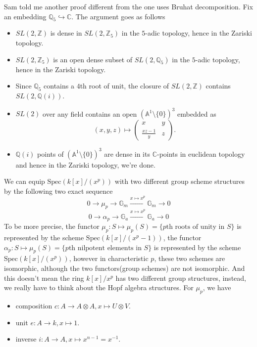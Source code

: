 \documentclass[../main.tex]{subfiles}
\begin{document}
\begin{example}
Sam told me another proof different from the one uses Bruhat decomposition. Fix an embedding $\mathbb{Q}_{5}\hookrightarrow \mathbb{C}$. The argument goes as follows
\begin{itemize}
\item $SL(2,\mathbb{Z})$ is dense in $SL(2,\mathbb{Z}_{5})$ in the $5$-adic topology, hence in the Zariski topology.
\item $SL(2,\mathbb{Z}_{5})$ is an open dense subset of $SL(2,\mathbb{Q}_{5})$ in the $5$-adic topology, hence in the Zariski topology.
\item Since $\mathbb{Q}_{5}$ contains a $4$th root of unit, the closure of $SL(2,\mathbb{Z})$ contains $SL(2,\mathbb{Q}(i))$.
\item $SL(2)$ over any field contains an open $(\mathbb{A}^{1}\setminus\{0\})^{3}$ embedded as 
$$(x,y,z)\mapsto \begin{pmatrix}x & y\\ \frac{xz-1}{y}  & z\end{pmatrix}.$$
\item $\mathbb{Q}(i)$ points of $(\mathbb{A}^{1}\setminus\{0\})^{3}$ are dense in its $\mathbb{C}$-points in euclidean topology and hence in the Zariski topology, we're done.
\end{itemize}
\end{example}


\begin{remark}
We can equip $\mathrm{Spec}(k[x]/(x^{p}))$ with two different group scheme structures by the following two exact sequence 
$$0\rightarrow \mu_{p}\rightarrow \mathbb{G}_{m}\xrightarrow{x\mapsto x^{p}}\mathbb{G}_{m}\rightarrow 0$$
$$0\rightarrow \alpha_{p}\rightarrow \mathbb{G}_{a}\xrightarrow{x\mapsto x^{p}}\mathbb{G}_{a}\rightarrow 0$$
To be more precise, the functor $\mu_{p}: S\mapsto \mu_{p}(S)=\{\text{$p$th roots of unity in $S$}\}$
is represented by the scheme $\mathrm{Spec}(k[x]/(x^{p}-1))$, the functor $\alpha_{p}: S\mapsto \mu_{p}(S)=\{\text{$p$th nilpotent elements in $S$}\}$
is represented by the scheme $\mathrm{Spec}(k[x]/(x^{p}))$, however in characteristic $p$, these two schemes are isomorphic, although the two functors(group schemes) are not isomorphic. And this doesn't mean the ring $k[x]/x^{p}$ has two different group structures, instead, we really have to think about the Hopf algebra structures. For $\mu_{p}$, we have 
\begin{itemize}
\item composition $c:A\rightarrow A\otimes A, x\mapsto U\otimes V$.
\item unit $e:A\rightarrow k, x\mapsto 1$.
\item inverse $i:A\rightarrow A, x\mapsto x^{n-1}=x^{-1}.$
\end{itemize}
\end{remark}
\end{document}
